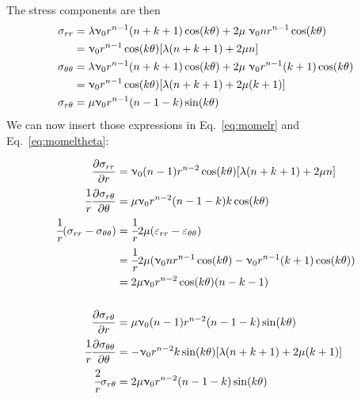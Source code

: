 The stress components are then
\begin{align}
\sigma_{rr} 
&= \lambda \upnu_0  r^{n-1} (n+k+1) \cos (k\theta )+ 2 \mu  \; \upnu_0 n r^{n-1} \cos (k\theta) 
\nonumber\\
&=  \upnu_0  r^{n-1}  \cos (k\theta )
[\lambda (n+k+1)+2\mu n]
\nonumber\\
\sigma_{\theta\theta} 
&= \lambda \upnu_0  r^{n-1} (n+k+1) \cos (k\theta )+ 2 \mu \; \upnu_0 r^{n-1} (k+1) \cos (k\theta) \nonumber\\
&= \upnu_0  r^{n-1} \cos (k\theta )
[\lambda(n+k+1) + 2 \mu (k+1) ] \nonumber\\
\sigma_{r\theta} &= \mu \upnu_0  r^{n-1}  (n-1-k)  \sin (k \theta) \nonumber
\end{align}
We can now insert those expressions in Eq.~\eqref{eq:momelr} and Eq.~\eqref{eq:momeltheta}:


\begin{align}
\frac{\partial \sigma_{rr}}{\partial r} 
&=  \upnu_0 (n-1) r^{n-2}  \cos (k\theta )
[\lambda (n+k+1)+2\mu n] \nonumber\\
\cfrac{1}{r}\frac{\partial \sigma_{r\theta}}{\partial \theta} 
&= \mu \upnu_0  r^{n-2}  (n-1-k)k  \cos (k \theta) 
\nonumber\\
\cfrac{1}{r}(\sigma_{rr}-\sigma_{\theta\theta})
& = \cfrac{1}{r} 2 \mu  ( \varepsilon_{rr} -\varepsilon_{\theta\theta} )  \nonumber\\
&=\cfrac{1}{r} 2 \mu  ( \upnu_0 n r^{n-1} \cos (k\theta) 
- \upnu_0 r^{n-1} (k+1) \cos (k\theta) ) \nonumber\\
&= 2 \mu\upnu_0 r^{n-2} \cos (k\theta) ( n-k-1)  
\nonumber\\
\nonumber\\
\frac{\partial \sigma_{r\theta}}{\partial r} 
&= \mu \upnu_0 (n-1) r^{n-2}  (n-1-k)  \sin (k \theta)  
\nonumber\\
\cfrac{1}{r}\frac{\partial \sigma_{\theta\theta}}{\partial \theta} 
&=  -\upnu_0  r^{n-2}  k \sin (k\theta )
[\lambda(n+k+1) + 2 \mu (k+1) ] \nonumber\\
\cfrac{2}{r}\sigma_{r\theta} 
&= 2\mu \upnu_0  r^{n-2}  (n-1-k)  \sin (k \theta) \nonumber
\end{align}

